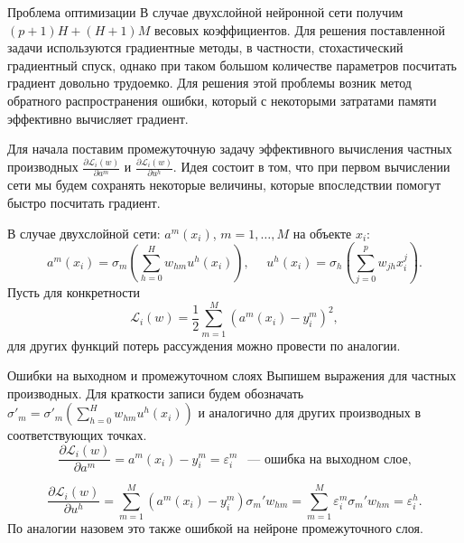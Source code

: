 \documentclass[11pt]{beamer}
\begin{document}
	\begin{frame}{Проблема оптимизации}
		В случае двухслойной нейронной сети получим $(p+1)H+(H+1)M$ весовых коэффициентов. Для решения поставленной задачи используются градиентные методы, в частности, стохастический градиентный спуск, однако при таком большом количестве параметров посчитать градиент довольно трудоемко. Для решения этой проблемы возник метод обратного распространения ошибки, который с некоторыми затратами памяти эффективно вычисляет градиент.
	\end{frame}

	\begin{frame}
		Для начала поставим промежуточную задачу эффективного вычисления частных производных $\frac{\partial \mathcal{L}_i(w)}{\partial a^m}$ и $\frac{\partial \mathcal{L}_i(w)}{\partial u^h}$. Идея состоит в том, что при первом вычислении сети мы будем сохранять некоторые величины, которые впоследствии помогут быстро посчитать градиент.
		
		В случае двухслойной сети: $a^m(x_i)$, $m=1,\ldots,M$ на объекте $x_i$:
		\begin{equation*}
			a^m(x_i) = \sigma_m \left(\sum_{h=0}^{H} w_{hm}  u^h(x_i)  \right), ~~~~~~
			u^h(x_i) = \sigma_h \left(\sum_{j=0}^{p} w_{jh} x_{i}^j   \right).
		\end{equation*}
		Пусть для конкретности
		\begin{equation*}
			\mathcal{L}_i(w) = \frac{1}{2} \sum_{m=1}^{M}(a^m(x_i) - y^m_i)^2,
		\end{equation*}
		для других функций потерь рассуждения можно провести по аналогии.
	\end{frame}

	\begin{frame}{Ошибки на выходном и промежуточном слоях}
		Выпишем выражения для частных производных. Для краткости записи будем обозначать $\sigma'_m = \sigma'_m (\sum\limits_{h=0}^H w_{hm} u^h(x_i))$ и аналогично для других производных в соответствующих точках.
		\begin{equation*}
			\frac{\partial \mathcal{L}_i(w)}{\partial a^m} = a^m(x_i) - y_i^m = \varepsilon^m_i ~~\text{ --- ошибка на выходном слое,}
		\end{equation*}
		
		\begin{equation*}
			\frac{\partial \mathcal{L}_i(w)}{\partial u^h} = \sum \limits_{m=1}^M (a^m(x_i) - y_i^m) \sigma_m' w_{hm} = \sum \limits_{m=1}^M \varepsilon^m_i \sigma_m' w_{hm} = \varepsilon^h_i.
		\end{equation*}
		По аналогии назовем это также ошибкой на нейроне промежуточного слоя.
	\end{frame}
\end{document}
